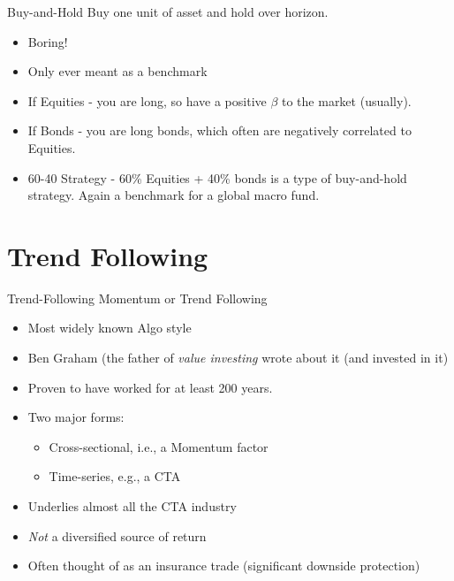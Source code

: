 \begin{frame}{Buy-and-Hold}
Buy one unit of asset and hold over horizon.
    \begin{itemize}
    \item  
    Boring!
    \item 
    Only ever meant as a benchmark
    \item 
    If Equities - you are long, so have a positive $\beta$ to the market (usually).
    \item 
    If Bonds - you are long bonds, which often are negatively correlated to Equities.
    \item 
    60-40 Strategy - 60\%  Equities + 40\% bonds is a type of buy-and-hold strategy. Again a benchmark for a global macro fund.
    \end{itemize}
\end{frame}


\section{Trend Following}

\begin{frame}{Trend-Following}
Momentum or Trend Following
    \begin{itemize}
    \item 
    Most widely known Algo style
    \item 
    Ben Graham (the father of {\sl value investing} wrote about it (and invested in it)
    \item 
    Proven to have worked for at least 200 years.
    \end{itemize}
    
    \begin{itemize}
    \item
    Two major forms:
        \begin{itemize}
        \item
        Cross-sectional, i.e., a Momentum factor
        \item
        Time-series, e.g., a CTA
        \end{itemize}
    \item
    Underlies almost all the CTA industry
    \item
    \emph{Not} a diversified source of return
    \item 
    Often thought of as an insurance trade (significant downside protection)
    \end{itemize}
\end{frame}


